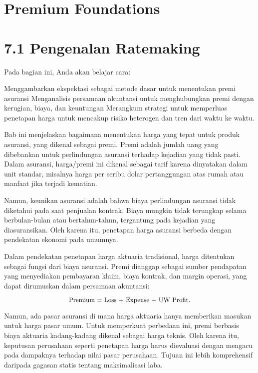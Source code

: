 \documentclass[
]{book}
\begin{document}
\hypertarget{premium-foundations}{%
\chapter{Premium Foundations}\label{premium-foundations}}

\hypertarget{pengenalan-ratemaking}{%
\chapter{7.1 Pengenalan Ratemaking}\label{pengenalan-ratemaking}}

Pada bagian ini, Anda akan belajar cara:

Menggambarkan ekspektasi sebagai metode dasar untuk menentukan premi asuransi
Menganalisis persamaan akuntansi untuk menghubungkan premi dengan kerugian, biaya, dan keuntungan
Merangkum strategi untuk memperluas penetapan harga untuk mencakup risiko heterogen dan tren dari waktu ke waktu.

Bab ini menjelaskan bagaimana menentukan harga yang tepat untuk produk asuransi, yang dikenal sebagai premi. Premi adalah jumlah uang yang dibebankan untuk perlindungan asuransi terhadap kejadian yang tidak pasti. Dalam asuransi, harga/premi ini dikenal sebagai tarif karena dinyatakan dalam unit standar, misalnya harga per seribu dolar pertanggungan atas rumah atau manfaat jika terjadi kematian.

Namun, keunikan asuransi adalah bahwa biaya perlindungan asuransi tidak diketahui pada saat penjualan kontrak. Biaya mungkin tidak terungkap selama berbulan-bulan atau bertahun-tahun, tergantung pada kejadian yang diasuransikan. Oleh karena itu, penetapan harga asuransi berbeda dengan pendekatan ekonomi pada umumnya.

Dalam pendekatan penetapan harga aktuaria tradisional, harga ditentukan sebagai fungsi dari biaya asuransi. Premi dianggap sebagai sumber pendapatan yang menyediakan pembayaran klaim, biaya kontrak, dan margin operasi, yang dapat dirumuskan dalam persamaan akuntansi:

\begin{equation}
\small{
\text{Premium = Loss + Expense + UW Profit} .
}
\end{equation}

Namun, ada pasar asuransi di mana harga aktuaria hanya memberikan masukan untuk harga pasar umum. Untuk memperkuat perbedaan ini, premi berbasis biaya aktuaria kadang-kadang dikenal sebagai harga teknis. Oleh karena itu, keputusan perusahaan seperti penetapan harga harus dievaluasi dengan mengacu pada dampaknya terhadap nilai pasar perusahaan. Tujuan ini lebih komprehensif daripada gagasan statis tentang maksimalisasi laba.
\end{document}

